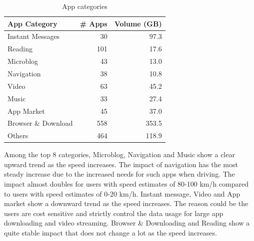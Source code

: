 \begin{table}[h]
	\centering
	\begin{tabular}{lrr}\hline
	App Category & \# Apps & Volume (GB) \\
    \hline
	Instant Messages & 30 & 97.3\\
	Reading & 101 & 17.6\\
	Microblog & 43 & 13.0\\
	Navigation & 38 & 10.8\\
	Video & 63 & 45.2\\
	Music & 33 & 27.4\\
	App Market & 45 & 37.0\\
	Browser \& Download & 558 & 353.5\\
	Others & 464 & 118.9\\
    \hline
	\end{tabular}
	\caption{App categories}
	\label{table:appcat}
\end{table}


Among the top 8 categories, Microblog, Navigation and Music show a clear upward trend as the speed increases.
The impact of navigation has the most steady increase due to the increased needs for such apps when driving.
The impact almost doubles for users with speed estimates of 80-100 km/h compared to users with speed estimates of 0-20 km/h.
Instant message, Video and App market show a downward trend as the speed increases.
The reason could be the users are cost sensitive and strictly control the data usage for large app downloading and video streaming.
Browser \& Downloading and Reading show a quite stable impact that does not change a lot as the speed increases.

